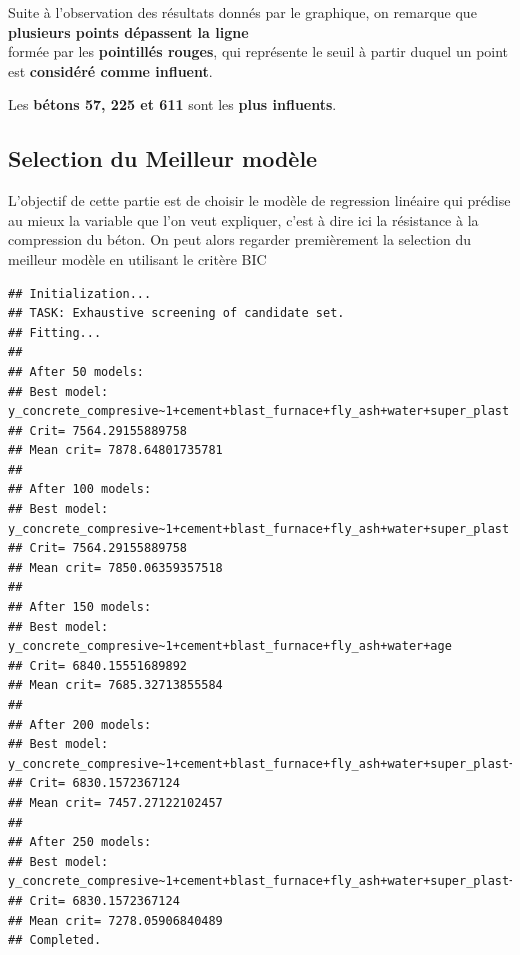 \documentclass[
  12pt,
]{article}
\begin{document}
Suite à l'observation des résultats donnés par le graphique, on remarque
que \textbf{plusieurs points dépassent la ligne}\\
formée par les \textbf{pointillés rouges}, qui représente le seuil à
partir duquel un point est \textbf{considéré comme influent}.

Les \textbf{bétons 57, 225 et 611} sont les \textbf{plus influents}.

\subsection{Selection du Meilleur
modèle}\label{selection-du-meilleur-moduxe8le}

L'objectif de cette partie est de choisir le modèle de regression
linéaire qui prédise au mieux la variable que l'on veut expliquer, c'est
à dire ici la résistance à la compression du béton. On peut alors
regarder premièrement la selection du meilleur modèle en utilisant le
critère BIC

\begin{verbatim}
## Initialization...
## TASK: Exhaustive screening of candidate set.
## Fitting...
## 
## After 50 models:
## Best model: y_concrete_compresive~1+cement+blast_furnace+fly_ash+water+super_plast
## Crit= 7564.29155889758
## Mean crit= 7878.64801735781
## 
## After 100 models:
## Best model: y_concrete_compresive~1+cement+blast_furnace+fly_ash+water+super_plast
## Crit= 7564.29155889758
## Mean crit= 7850.06359357518
## 
## After 150 models:
## Best model: y_concrete_compresive~1+cement+blast_furnace+fly_ash+water+age
## Crit= 6840.15551689892
## Mean crit= 7685.32713855584
## 
## After 200 models:
## Best model: y_concrete_compresive~1+cement+blast_furnace+fly_ash+water+super_plast+age
## Crit= 6830.1572367124
## Mean crit= 7457.27122102457
## 
## After 250 models:
## Best model: y_concrete_compresive~1+cement+blast_furnace+fly_ash+water+super_plast+age
## Crit= 6830.1572367124
## Mean crit= 7278.05906840489
## Completed.
\end{verbatim}
\end{document}
